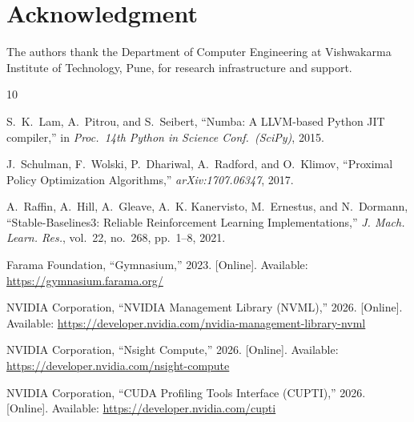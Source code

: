 \documentclass[journal,letterpaper]{IEEEtran}
\begin{document}
\balance

\section*{Acknowledgment}
The authors thank the Department of Computer Engineering at Vishwakarma Institute of Technology, Pune, for research infrastructure and support.

\begin{thebibliography}{10}

S.~K.~Lam, A.~Pitrou, and S.~Seibert, ``Numba: A LLVM-based Python JIT compiler,'' in \textit{Proc.\ 14th Python in Science Conf.\ (SciPy)}, 2015.

J.~Schulman, F.~Wolski, P.~Dhariwal, A.~Radford, and O.~Klimov, ``Proximal Policy Optimization Algorithms,'' \textit{arXiv:1707.06347}, 2017.

A.~Raffin, A.~Hill, A.~Gleave, A.~K. Kanervisto, M.~Ernestus, and N.~Dormann, ``Stable-Baselines3: Reliable Reinforcement Learning Implementations,'' \textit{J. Mach. Learn. Res.}, vol.~22, no.~268, pp.~1--8, 2021.

Farama Foundation, ``Gymnasium,'' 2023. [Online]. Available: \url{https://gymnasium.farama.org/}

NVIDIA Corporation, ``NVIDIA Management Library (NVML),'' 2026. [Online]. Available: \url{https://developer.nvidia.com/nvidia-management-library-nvml}

NVIDIA Corporation, ``Nsight Compute,'' 2026. [Online]. Available: \url{https://developer.nvidia.com/nsight-compute}

NVIDIA Corporation, ``CUDA Profiling Tools Interface (CUPTI),'' 2026. [Online]. Available: \url{https://developer.nvidia.com/cupti}

\end{thebibliography}
\end{document}
